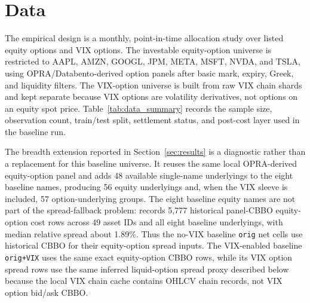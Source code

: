 
\section{Data}\label{sec:data}

The empirical design is a monthly, point-in-time allocation study over listed equity options
and VIX options. The investable equity-option universe is restricted to AAPL, AMZN, GOOGL,
JPM, META, MSFT, NVDA, and TSLA, using OPRA/Databento-derived option panels after basic
mark, expiry, Greek, and liquidity filters. The VIX-option universe is built from raw VIX
chain shards and kept separate because VIX options are volatility derivatives, not options
on an equity spot price. Table~\ref{tab:data_summary} records the sample size, observation
count, train/test split, settlement status, and post-cost layer used in the baseline run.

The breadth extension reported in Section~\ref{sec:results} is a diagnostic rather than a
replacement for this baseline universe. It reuses the same local OPRA-derived equity-option
panel and adds 48 available single-name underlyings to the eight baseline names, producing
56 equity underlyings and, when the VIX sleeve is included, 57 option-underlying groups.
The eight baseline equity names are not part of the spread-fallback problem:
 records 5,777 historical panel-CBBO equity-option
cost rows across 49 asset IDs and all eight baseline underlyings, with median relative
spread about 1.89\%. Thus the no-VIX baseline \texttt{orig} net cells use historical
CBBO for their equity-option spread inputs. The VIX-enabled baseline \texttt{orig+VIX}
uses the same exact equity-option CBBO rows, while its VIX option spread rows use the
same inferred liquid-option spread proxy described below because the local VIX chain cache
contains OHLCV chain records, not VIX option bid/ask CBBO.

